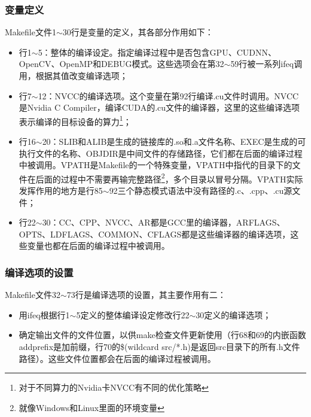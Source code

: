 \subsubsection{变量定义}
Makefile文件1$\sim$30行是变量的定义，其各部分作用如下：
\begin{itemize}
	\item 行1$\sim$5：整体的编译设定。指定编译过程中是否包含GPU、CUDNN、OpenCV、OpenMP和DEBUG模式。这些选项会在第32$\sim$59行被一系列ifeq调用，根据其值改变编译选项；
	\item 行7$\sim$12：NVCC的编译选项。这个变量在第92行编译.cu文件时调用。NVCC是Nvidia C Compiler，编译CUDA的.cu文件的编译器，这里的这些编译选项表示编译的目标设备的算力\footnote{对于不同算力的Nvidia卡NVCC有不同的优化策略}；
	\item 行16$\sim$20：SLIB和ALIB是生成的链接库的.so和.a文件名称、EXEC是生成的可执行文件的名称、OBJDIR是中间文件的存储路径，它们都在后面的编译过程中被调用。VPATH是Makefile的一个特殊变量，VPATH中指代的目录下的文件在后面的过程中不需要再输完整路径\footnote{就像Windows和Linux里面的环境变量}，多个目录以冒号分隔。VPATH实际发挥作用的地方是行85$\sim$92三个静态模式语法中没有路径的.c、.cpp、.cu源文件；
	\item 行22$\sim$30：CC、CPP、NVCC、AR都是GCC里的编译器，ARFLAGS、OPTS、LDFLAGS、COMMON、CFLAGS都是这些编译器的编译选项，这些变量也都在后面的编译过程中被调用。
\end{itemize}

\subsubsection{编译选项的设置}
Makefile文件32$\sim$73行是编译选项的设置，其主要作用有二：
\begin{itemize}
	\item 用ifeq根据行1$\sim$5定义的整体编译设定修改行22$\sim$30定义的编译选项；
	\item 确定输出文件的文件位置，以供make检查文件更新使用（行68和69的内嵌函数addprefix是加前缀，行70的\$(wildcard src/*.h)是返回src目录下的所有.h文件路径）。这些文件位置都会在后面的编译过程被调用。
\end{itemize}

